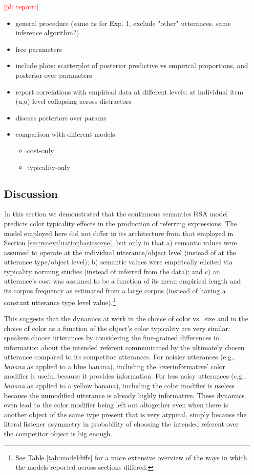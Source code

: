 \documentclass[11pt]{article}
\newcommand{\jd}[1]{\textcolor{Red}{[jd: #1]}}
\newcommand{\tableref}[1]{Table \ref{#1}}
\newcommand{\sectionref}[1]{Section \ref{#1}}
\begin{document}
\jd{report:}
\begin{itemize}
	\item general procedure (same as for Exp. 1, exclude "other" utterances. same inference algorithm?)
	\item free parameters
	\item include plots: scatterplot of posterior predictive vs empirical proportions, and posterior over parameters
	\item report correlations with empirical data at different levels: at individual item (u,o) level collapsing across distractors
	\item discuss posteriors over params
	\item comparison with different models:
	\begin{itemize}
		\item cost-only
		\item typicality-only
	\end{itemize}
\end{itemize}




\subsection{Discussion}

In this section we demonstrated that the continuous semantics RSA model predicts color typicality effects in the production of referring expressions. The model employed here did not differ in its architecture from that employed in \sectionref{sec:rsaevaluationbasicscene}, but only in that a) semantic values were assumed to operate at the individual utterance/object level (instead of at the utterance type/object level); b) semantic values were empirically elicited via typicality norming studies (instead of inferred from the data); and c) an utterance's cost was assumed to be a function of its mean empirical length and its corpus frequency as estimated from a large corpus (instead of having a constant utterance type level value).\footnote{See \tableref{tab:modeldiffs} for a more extensive overview of the ways in which the models reported across sections differed.} 

This suggests that the dynamics at work in the choice of color vs.~size and in the choice of color as a function of the object's color typicality are very similar: speakers choose utterances by considering the fine-grained differences in information about the intended referent communicated by the ultimately chosen utterance compared to its competitor utterances. For noisier utterances (e.g., \emph{banana} as applied to a blue banana), including the `overinformative' color modifier is useful because it provides information. For less noisy utterances (e.g., \emph{banana} as applied to a yellow banana), including the color modifier is useless because the unmodified utterance is already highly informative. These dynamics even lead to the color modifier being left out altogether even when there is another object of the same type present that is very atypical, simply because the literal listener asymmetry in probability of choosing the intended referent over the competitor object is big enough.
\end{document}
